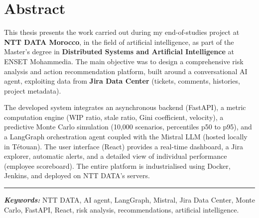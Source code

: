 \chapter*{Abstract}

\vspace{-0.5cm}

This thesis presents the work carried out during my end-of-studies project at \textbf{NTT DATA Morocco}, in the field of artificial intelligence, as part of the Master’s degree in \textbf{Distributed Systems and Artificial Intelligence} at ENSET Mohammedia. The main objective was to design a comprehensive risk analysis and action recommendation platform, built around a conversational AI agent, exploiting data from \textbf{Jira Data Center} (tickets, comments, histories, project metadata).

The developed system integrates an asynchronous backend (FastAPI), a metric computation engine (WIP ratio, stale ratio, Gini coefficient, velocity), a predictive Monte Carlo simulation (10,000 scenarios, percentiles p50 to p95), and a LangGraph orchestration agent coupled with the Mistral LLM (hosted locally in Tétouan). The user interface (React) provides a real-time dashboard, a Jira explorer, automatic alerts, and a detailed view of individual performance (employee scoreboard). The entire platform is industrialised using Docker, Jenkins, and deployed on NTT DATA’s servers.

\vspace{1em}
\noindent\rule{\linewidth}{0.4pt}
\vspace{0.5em}

\begin{flushright}
	\textbf{\textit{Keywords:}} NTT DATA, AI agent, LangGraph, Mistral, Jira Data Center, Monte Carlo, FastAPI, React, risk analysis, recommendations, artificial intelligence.
\end{flushright}